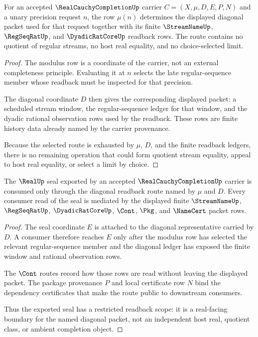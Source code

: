 \begin{theorem}
\label{thm:real-cauchy-completion-modulus-diagonal-exactness}
For an accepted $\RealCauchyCompletionUp$ carrier $C=(X,\mu,D,E,P,N)$ and a unary precision request $n$, the row $\mu(n)$ determines the displayed diagonal packet used for that request together with its finite $\StreamNameUp$, $\RegSeqRatUp$, and $\DyadicRatCoreUp$ readback rows. The route contains no quotient of regular streams, no host real equality, and no choice-selected limit.
\end{theorem}
\begin{proof}
The modulus row is a coordinate of the carrier, not an external completeness principle. Evaluating it at $n$ selects the late regular-sequence member whose readback must be inspected for that precision.

The diagonal coordinate $D$ then gives the corresponding displayed packet: a scheduled stream window, the regular-sequence ledger for that window, and the dyadic rational observation rows used by the readback. These rows are finite history data already named by the carrier provenance.

Because the selected route is exhausted by $\mu$, $D$, and the finite readback ledgers, there is no remaining operation that could form quotient stream equality, appeal to host real equality, or select a limit by choice.
\end{proof}

\begin{theorem}
\label{thm:real-cauchy-completion-real-seal-readback-scope}
The $\RealUp$ seal exported by an accepted $\RealCauchyCompletionUp$ carrier is consumed only through the diagonal readback route named by $\mu$ and $D$. Every consumer read of the seal is mediated by the displayed finite $\StreamNameUp$, $\RegSeqRatUp$, $\DyadicRatCoreUp$, $\Cont$, $\Pkg$, and $\NameCert$ packet rows.
\end{theorem}
\begin{proof}
The seal coordinate $E$ is attached to the diagonal representative carried by $D$. A consumer therefore reaches $E$ only after the modulus row has selected the relevant regular-sequence member and the diagonal ledger has exposed the finite window and rational observation rows.

The $\Cont$ routes record how those rows are read without leaving the displayed packet. The package provenance $P$ and local certificate row $N$ bind the dependency certificates that make the route public to downstream consumers.

Thus the exported seal has a restricted readback scope: it is a real-facing boundary for the named diagonal packet, not an independent host real, quotient class, or ambient completion object.
\end{proof}

